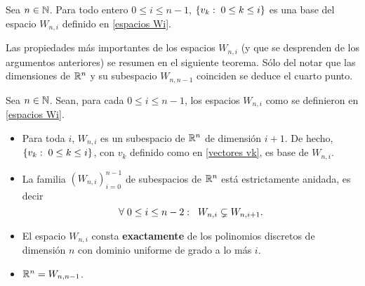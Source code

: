 \begin{cor}
Sea $n \in \mathbb{N}$. Para todo entero $0 \leq i \leq n-1$, 
$\{v_{k}: \hspace{0.1cm} 0\leq k \leq i \}$ es una base
del espacio $W_{n,i}$
definido en \eqref{espacios Wi}.
\end{cor}


Las propiedades más importantes de los
espacios $W_{n,i}$ (y que se desprenden
de los argumentos anteriores) se 
resumen en el siguiente teorema. 
Sólo del notar que las dimensiones de 
$\mathbb{R}^{n}$ y su subespacio $W_{n, n-1}$
coinciden se deduce el cuarto punto.


\begin{teo}
\label{cor: propiedades importantes de espacios Wi}
Sea $n \in \mathbb{N}$. Sean, para cada $0 \leq i \leq n-1$,
los espacios $W_{n,i}$ como
se definieron en \eqref{espacios Wi}.
\begin{itemize}
\item Para toda $i$, $W_{n,i}$ es un subespacio
de $\mathbb{R}^{n}$ de dimensión $i+1$. De hecho, 
$\{v_{k}: \hspace{0.1cm} 0\leq k \leq i \}$, con
$v_{k}$ definido como en \eqref{vectores vk},
es base de $W_{n,i}$.

\item La familia $(W_{n,i})_{i=0}^{n-1}$ de subespacios
	de $\mathbb{R}^{n}$ está estrictamente anidada, es decir
	\begin{equation}
	\label{espacios Wi estan anidados}
	\forall \hspace{0.1cm}
	0 \leq i \leq n-2: \hspace{0.2cm}
	W_{n,i} \subsetneq W_{n,i+1}.
	\end{equation}

\item El espacio $W_{n,i}$ consta \textbf{exactamente}
de los polinomios discretos de dimensión $n$ con dominio uniforme
de grado a lo más $i$.

\item $\mathbb{R}^{n}= W_{n,n-1}$.
\end{itemize}
\end{teo}

